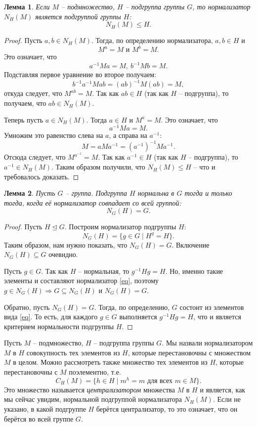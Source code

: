 \documentclass{article}
\newtheorem{lemma}{Лемма}[section]
\begin{document}
\begin{lemma}
    Если $M$ -- подмножество, $H$ -- подгруппа группы $G$, то нормализатор $N_H(M)$ является подгруппой группы $H$:
    \[
        N_H(M) \leqslant H.
    \]
\end{lemma}
\begin{proof}
    Пусть $a, b \in N_H(M)$. Тогда, по определению нормализатора, $a, b \in H$ и $$ M^a = M \text{ и } M^b = M. $$ Это означает, что $$ a^{-1} M a = M, \ b^{-1} M b = M. $$ Подставляя первое уравнение во второе получаем: $$ b^{-1} a^{-1} M a b = (ab)^{-1} M (ab) = M, $$ откуда следует, что $M^{ab} = M$. Так как $ab \in H$ (так как $H$ -- подгруппа), то получаем, что $ ab \in N_H(M)$.

    Теперь пусть $a \in N_H(M)$. Тогда $a \in H$ и $M^a = M$. Это означает, что $$ a^{-1} M a = M. $$ Умножим это равенство слева на $a$, а справа на $a^{-1}$: $$ M = a M a^{-1} = (a^{-1})^{-1} M a^{-1}. $$ Отсюда следует, что $M^{a^{-1}} = M$. Так как $a^{-1} \in H$ (так как $H$ -- подгруппа), то $a^{-1} \in N_H(M)$.
    Таким образом получили, что $N_H(M) \leqslant H$ -- что и требовалось доказать.
\end{proof}

\begin{lemma}
    Пусть $G$ -- группа. Подгруппа $H$ нормальна в $G$ тогда и только тогда, когда её нормализатор совпадает со всей группой: $$ N_G (H) = G. $$ 
\end{lemma}
\begin{proof}
    Пусть $H \trianglelefteq G$. Построим нормализатор подгруппы $H$:
    \[ \label{eq} \tag{$\ast$}
        N_G(H) = \{ g \in G \mid H^g = H \}.
    \]
    Таким образом, нам нужно показать, что $N_G(H) = G$. Включение $N_G (H) \subseteq G$ очевидно.

    Пусть $g \in G$. Так как $H$ -- нормальная, то $g^{-1} H g = H$. Но, именно такие элементы и составляют нормализатор \eqref{eq}, поэтому $g \in N_G(H) \Rightarrow G \subseteq N_G(H)$ и $N_G(H) = G$.

    Обратно, пусть $N_G(H) = G$. Тогда, по определению, $G$ состоит из элементов вида \eqref{eq}. То есть, для каждого $g \in G$ выполняется $ g^{-1} H g = H $, что и является критерием нормальности подгруппы $H$.
\end{proof}

Пусть $M$ -- подмножество, $H$ -- подгруппа группы $G$. Мы назвали нормализатором $M$ в $H$ совокупность тех элементов из $H$, которые перестановочны с множеством $M$ в целом. Можно рассмотреть также множество тех элементов из $H$, которые перестановочны с $M$ поэлементно, т.е.
\[
    C_H(M) = \{ h \in H \mid m^h = m \text{ для всех } m \in M \}.
\]
Это множество называется \textit{централизатором} множества $M$ в $H$ и является, как мы сейчас увидим, нормальной подгруппой нормализатора $N_H(M)$. Если не указано, в какой подгруппе $H$ берётся централизатор, то это означает, что он берётся во всей группе $G$.
\end{document}
